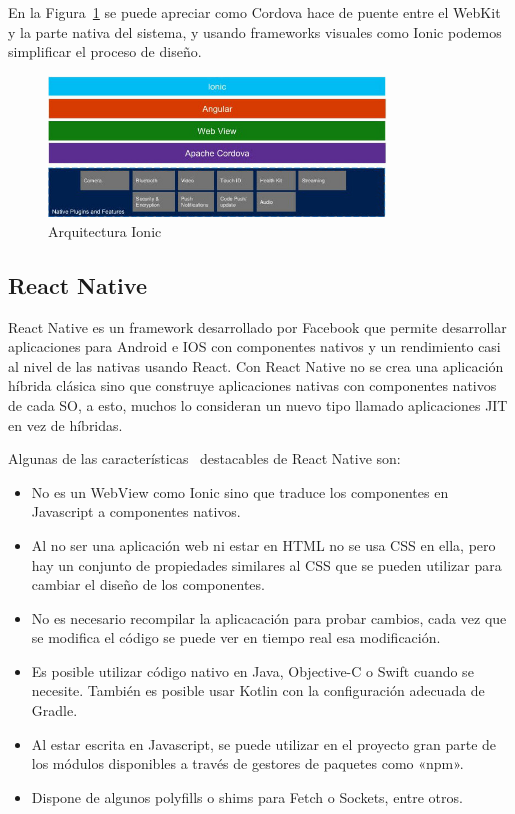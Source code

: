 En la Figura~\ref{fig:CORDOVAimg} se puede apreciar como Cordova hace de puente entre el WebKit y la parte nativa del sistema, y usando 
frameworks visuales como Ionic podemos simplificar el proceso de diseño.

\begin{figure}[!h]
	\begin{center}
		\includegraphics[width=0.8\textwidth]{./img/cordova.jpg}
		\caption{Arquitectura Ionic~\cite{CORDOVAimg}}
		\label{fig:CORDOVAimg}
	\end{center}
\end{figure}

\subsection{React Native}

React Native es un framework desarrollado por Facebook que permite desarrollar aplicaciones para Android e IOS 
con componentes nativos y un rendimiento casi al nivel de las nativas usando React. Con React Native no se crea 
una aplicación híbrida clásica sino que construye aplicaciones nativas con componentes nativos de cada \acs{SO}, 
a esto, muchos lo consideran un nuevo tipo llamado aplicaciones \acf{JIT} en vez de híbridas.

Algunas de las características~\cite{rnCaracteristicas} destacables de React Native son:
\begin{itemize}
	\item No es un WebView como Ionic sino que traduce los componentes en Javascript a componentes nativos.
	\item Al no ser una aplicación web ni estar en HTML no se usa CSS en ella, pero hay un conjunto de propiedades
	similares al CSS que se pueden utilizar para cambiar el diseño de los componentes.
	\item No es necesario recompilar la aplicacación para probar cambios, cada vez que se modifica el código 
	se puede ver en tiempo real esa modificación.
	\item Es posible utilizar código nativo en Java, Objective-C o Swift cuando se necesite. También es posible usar 
	Kotlin con la configuración adecuada de Gradle.
	\item Al estar escrita en Javascript, se puede utilizar en el proyecto gran parte de los módulos disponibles a través 
	de gestores de paquetes como «npm».
	\item Dispone de algunos polyfills o shims para Fetch o Sockets, entre otros.
\end{itemize}


